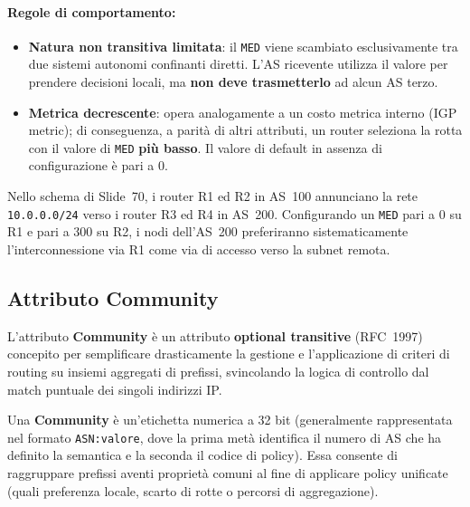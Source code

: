 \documentclass[11pt, a4paper]{article}
\begin{document}

\paragraph{Regole di comportamento:}
\begin{itemize}[noitemsep]
    \item \textbf{Natura non transitiva limitata}: il \texttt{MED} viene scambiato esclusivamente tra due sistemi autonomi confinanti diretti. L'AS ricevente utilizza il valore per prendere decisioni locali, ma \textbf{non deve trasmetterlo} ad alcun AS terzo.
    \item \textbf{Metrica decrescente}: opera analogamente a un costo metrica interno (IGP metric); di conseguenza, a parità di altri attributi, un router seleziona la rotta con il valore di \texttt{MED} \textbf{più basso}. Il valore di default in assenza di configurazione è pari a $0$.
\end{itemize}

Nello schema di Slide~70, i router R1 ed R2 in AS~100 annunciano la rete \texttt{10.0.0.0/24} verso i router R3 ed R4 in AS~200. Configurando un \texttt{MED} pari a $0$ su R1 e pari a $300$ su R2, i nodi dell'AS~200 preferiranno sistematicamente l'interconnessione via R1 come via di accesso verso la subnet remota.

\subsection{Attributo Community}

L'attributo \textbf{Community} è un attributo \textbf{optional transitive} (RFC~1997) concepito per semplificare drasticamente la gestione e l'applicazione di criteri di routing su insiemi aggregati di prefissi, svincolando la logica di controllo dal match puntuale dei singoli indirizzi IP.


Una \textbf{Community} è un'etichetta numerica a 32 bit (generalmente rappresentata nel formato \texttt{ASN:valore}, dove la prima metà identifica il numero di AS che ha definito la semantica e la seconda il codice di policy). Essa consente di raggruppare prefissi aventi proprietà comuni al fine di applicare policy unificate (quali preferenza locale, scarto di rotte o percorsi di aggregazione).
\end{document}

